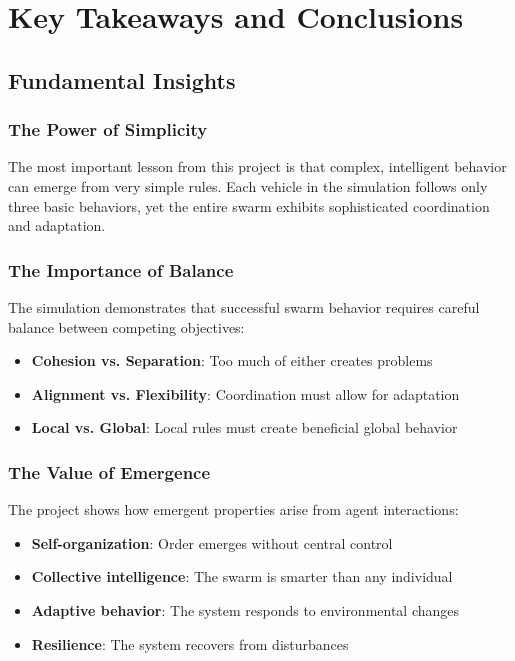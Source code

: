 \documentclass[12pt,a4paper]{article}
\begin{document}
\section{Key Takeaways and Conclusions}

\subsection{Fundamental Insights}

\subsubsection{The Power of Simplicity}
The most important lesson from this project is that complex, intelligent behavior can emerge from very simple rules. Each vehicle in the simulation follows only three basic behaviors, yet the entire swarm exhibits sophisticated coordination and adaptation.

\subsubsection{The Importance of Balance}
The simulation demonstrates that successful swarm behavior requires careful balance between competing objectives:
\begin{itemize}
    \item \textbf{Cohesion vs. Separation}: Too much of either creates problems
    \item \textbf{Alignment vs. Flexibility}: Coordination must allow for adaptation
    \item \textbf{Local vs. Global}: Local rules must create beneficial global behavior
\end{itemize}

\subsubsection{The Value of Emergence}
The project shows how emergent properties arise from agent interactions:
\begin{itemize}
    \item \textbf{Self-organization}: Order emerges without central control
    \item \textbf{Collective intelligence}: The swarm is smarter than any individual
    \item \textbf{Adaptive behavior}: The system responds to environmental changes
    \item \textbf{Resilience}: The system recovers from disturbances
\end{itemize}
\end{document}
